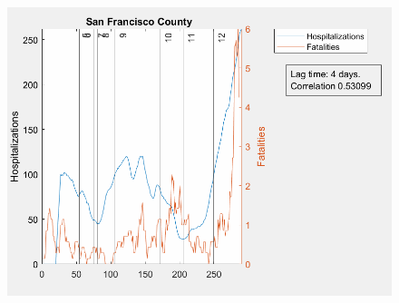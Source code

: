 \documentclass[12pt]{article}
\begin{document}
\begin{figure}[!h]
	\includegraphics[width=\linewidth]{images/san_francisco_hospitalizations_fatalities_line-4lag.png}
	\caption{}
	\label{fig:images/san_francisco_hospitalizations_fatalities_line-4lagLabel}
\end{figure}


	
\end{document}
